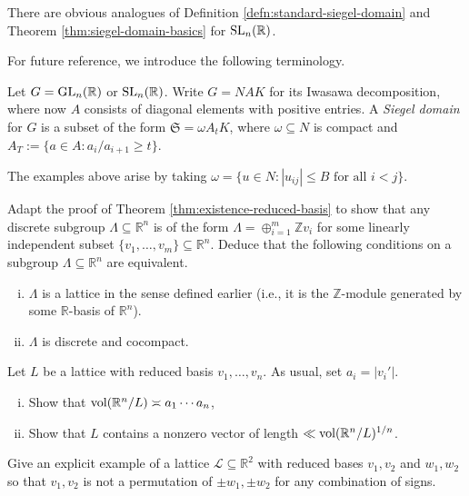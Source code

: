 \documentclass[reqno]{amsart} 
\begin{document}
There are obvious analogues of Definition \ref{defn:standard-siegel-domain} and Theorem \ref{thm:siegel-domain-basics} for $\operatorname{SL}_n(\mathbb{R})$.

For future reference, we introduce the following terminology.
\begin{definition}\label{defn:siegel-domain}
  Let $G = \operatorname{GL}_n(\mathbb{R})$ or $\operatorname{SL}_n(\mathbb{R})$.  Write $G = N A K$ for its Iwasawa decomposition, where now $A$ consists of diagonal elements with positive entries.  A \emph{Siegel domain} for $G$ is a subset of the form $\mathfrak{S} = \omega A_t K$, where $\omega \subseteq N$ is compact and $A_T := \{a \in A : a_i/a_{i+1} \geq t\}$.
\end{definition}
The examples above arise by taking $\omega = \{u \in N : |u_{i j} | \leq B \text{ for all } i < j\}$.


\begin{exercise}
  Adapt the proof of Theorem \ref{thm:existence-reduced-basis} to show that any discrete subgroup $\Lambda \subseteq \mathbb{R}^n$ is of the form $\Lambda = \oplus_{i=1}^m \mathbb{Z} v_i$ for some linearly independent subset $\{v_1,\dotsc,v_m\} \subseteq \mathbb{R}^n$.  Deduce that the following conditions on a subgroup $\Lambda \subseteq \mathbb{R}^n$ are equivalent.
  \begin{enumerate}
    [(i)]
  \item $\Lambda$ is a lattice in the sense defined earlier (i.e., it is the $\mathbb{Z}$-module generated by some $\mathbb{R}$-basis of $\mathbb{R}^n$).
  \item $\Lambda$ is discrete and cocompact.
  \end{enumerate}
\end{exercise}


\begin{exercise}
  Let $L$ be a lattice with reduced basis $v_1,\dotsc,v_n$.  As usual, set $a_i = |v_i'|$.
  \begin{enumerate}
    [(i)]
  \item Show that $\operatorname{vol}(\mathbb{R}^n/L) \asymp a_1 \dotsb a_n$,
  \item Show that $L$ contains a nonzero vector of length $\ll \operatorname{vol}(\mathbb{R}^n/L)^{1/n}$.
  \end{enumerate}
\end{exercise}

\begin{exercise}
  Give an explicit example of a lattice $\mathcal{L} \subseteq \mathbb{R}^2$ with reduced bases $v_1, v_2$ and $w_1, w_2$ so that $v_1, v_2$ is not a permutation of $\pm w_1, \pm w_2$ for any combination of signs.
\end{exercise}
\end{document}
